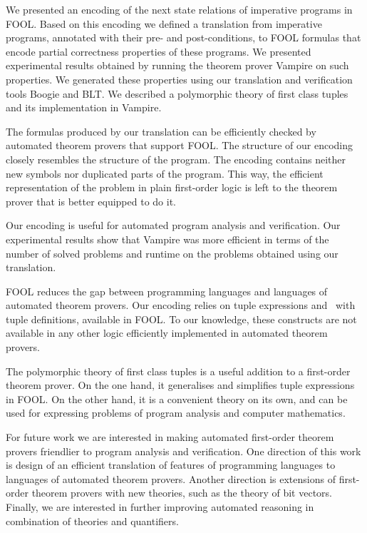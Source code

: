 We presented an encoding of the next state relations of imperative programs in FOOL. Based on this encoding we defined a translation from imperative programs, annotated with their pre- and post-conditions, to FOOL formulas that encode partial correctness properties of these programs. We presented experimental results obtained by running the theorem prover Vampire on such properties. We generated these properties using our translation and verification tools Boogie and BLT. We described a polymorphic theory of first class tuples and its implementation in Vampire.

The formulas produced by our translation can be efficiently checked by automated theorem provers that support FOOL. The structure of our encoding closely resembles the structure of the program. The encoding contains neither new symbols nor duplicated parts of the program. This way, the efficient representation of the problem in plain first-order logic is left to the theorem prover that is better equipped to do it.

Our encoding is useful for automated program analysis and verification. Our experimental results show that Vampire was more efficient in terms of the number of solved problems and runtime on the problems obtained using our translation.

FOOL reduces the gap between programming languages and languages of automated theorem provers. Our encoding relies on tuple expressions and \LETIN\ with tuple definitions, available in FOOL. To our knowledge, these constructs are not available in any other logic efficiently implemented in automated theorem provers.

The polymorphic theory of first class tuples is a useful addition to a first-order theorem prover. On the one hand, it generalises and simplifies tuple expressions in FOOL. On the other hand, it is a convenient theory on its own, and can be used for expressing problems of program analysis and computer mathematics.

For future work we are interested in making automated first-order theorem provers friendlier to program analysis and verification. One direction of this work is design of an efficient translation of features of programming languages to languages of automated theorem provers. Another direction is extensions of first-order theorem provers with new theories, such as the theory of bit vectors. Finally, we are interested in further improving automated reasoning in combination of theories and quantifiers.